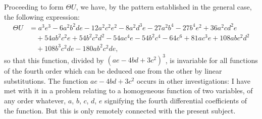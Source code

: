 \documentclass[11pt,a4paper]{book}
\begin{document}
Proceeding to form $\Theta U$, we have, by the pattern established in the general case,
the following expression:
\begin{align*}
\Theta U &= a^3e^3 - 6a^2b^2de - 12a^2c^2e^2 - 8a^2d^3e - 27a^2b^4 - 27b^4e^2 + 36a^2cd^2e \\
&\quad + 54ab^2c^2e + 54b^2c^2d^2 - 54ac^4e - 54b^2c^4 - 64c^6 + 81ac^3e + 108abc^2d^2 \\
&\quad + 108b^3c^2de - 180ab^2c^2de,
\end{align*}
so that this function, divided by $(ae - 4bd + 3c^2)^3$, is invariable for all functions of the
fourth order which can be deduced one from the other by linear substitutions. The
function $ae - 4bd + 3c^2$ occurs in other investigations: I have met with it in a problem
relating to a homogeneous function of two variables, of any order whatever, $a$, $b$, $c$, $d$, $e$
signifying the fourth differential coefficients of the function. But this is only remotely
connected with the present subject.
\end{document}
